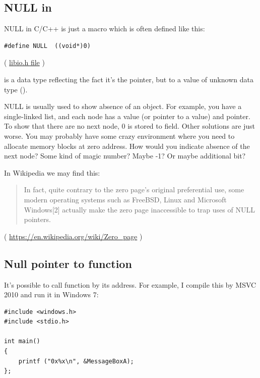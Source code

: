 \subsection{NULL in \CCpp}

NULL in C/C++ is just a macro which is often defined like this:

\begin{lstlisting}
#define NULL  ((void*)0)
\end{lstlisting}
( \href{https://github.com/wzhy90/linaro_toolchains/blob/8ff8ae680bac04558d10cc9626e12c4c2f6c1348/arm-cortex_a15-linux-gnueabihf/libc/usr/include/libio.h#L70}{libio.h file} )

 is a data type reflecting the fact it's the pointer, but to a value of unknown data type ().

NULL is usually used to show absence of an object.
For example, you have a single-linked list, and each node has a value (or pointer to a value) and  pointer.
To show that there are no next node, 0 is stored to  field.
Other solutions are just worse.
You may probably have some crazy environment where you need to allocate memory blocks at zero address. How would you indicate absence of the next node?
Some kind of magic number? Maybe -1? Or maybe additional bit?

In Wikipedia we may find this:

\begin{framed}
\begin{quotation}
In fact, quite contrary to the zero page's original preferential use, some modern operating systems such as FreeBSD, Linux and Microsoft Windows[2] actually make the zero page inaccessible to trap uses of NULL pointers. 
\end{quotation}
\end{framed}
( \url{https://en.wikipedia.org/wiki/Zero_page} )

\subsection{Null pointer to function}

It's possible to call function by its address.
For example, I compile this by MSVC 2010 and run it in Windows 7:

\begin{lstlisting}
#include <windows.h>
#include <stdio.h>

int main()
{
	printf ("0x%x\n", &MessageBoxA);
};
\end{lstlisting}

